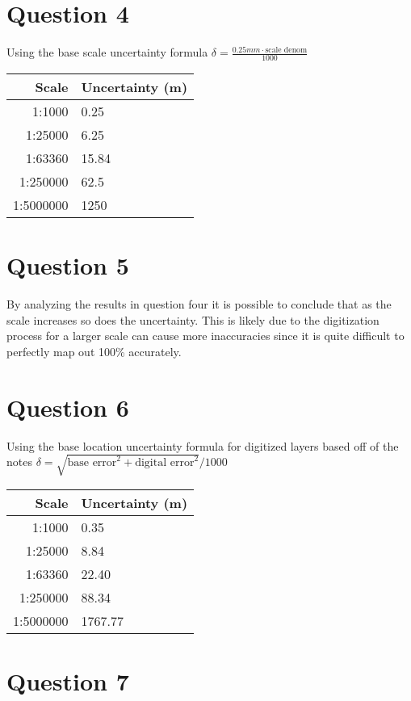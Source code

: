 \documentclass[fleqn, 12pt]{article}
\begin{document}
\section*{Question 4}

Using the base scale uncertainty formula $\delta = \frac{0.25mm \cdot \text{scale denom}}{1000}$\\

\begin{tabular}{rl}
    \hline
    Scale & Uncertainty (m)\\
    \hline
    1:1000 & 0.25\\
    1:25000 & 6.25\\
    1:63360 & 15.84\\
    1:250000 & 62.5\\
    1:5000000 & 1250\\\hline
\end{tabular}

\section*{Question 5}

By analyzing the results in question four it is possible to conclude that as the scale increases so does the uncertainty. This is likely due to the digitization process for a larger scale can cause more inaccuracies since it is quite difficult to perfectly map out 100\% accurately.

\section*{Question 6}

Using the base location uncertainty formula for digitized layers based off of the notes $\delta = \sqrt{\text{base error}^2 + \text{digital error}^2} / 1000$\\

\begin{tabular}{rl}
    \hline
    Scale & Uncertainty (m)\\
    \hline
    1:1000 & 0.35\\
    1:25000 & 8.84\\
    1:63360 & 22.40\\
    1:250000 & 88.34\\
    1:5000000 & 1767.77\\\hline
\end{tabular}

\section*{Question 7}
\end{document}
